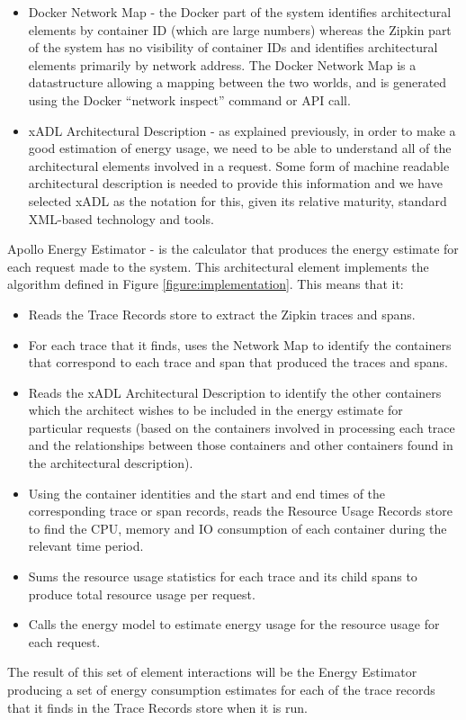 \begin{itemize}
\item Docker Network Map - the Docker part of the system identifies architectural elements by container ID (which are large numbers) whereas the Zipkin part of the system has no visibility of container IDs and identifies architectural elements primarily by network address.  The Docker Network Map is a datastructure allowing a mapping between the two worlds, and is generated using the Docker “network inspect” command or API call.
\item xADL Architectural Description - as explained previously, in order to make a good estimation of energy usage, we need to be able to understand all of the architectural elements involved in a request.  Some form of machine readable architectural description is needed to provide this information and we have selected xADL as the notation for this, given its relative maturity, standard XML-based technology and tools.
\end{itemize}

Apollo Energy Estimator - is the calculator that produces the energy estimate for each request made to the system.  This architectural element implements the algorithm defined in Figure \ref{figure:implementation}. This means that it:

\begin{itemize}
\item Reads the Trace Records store to extract the Zipkin traces and spans.
\item For each trace that it finds, uses the Network Map to identify the containers that correspond to each trace and span that produced the traces and spans.
\item Reads the xADL Architectural Description to identify the other containers which the architect wishes to be included in the energy estimate for particular requests (based on the containers involved in processing each trace and the relationships between those containers and other containers found in the architectural description).
\item Using the container identities and the start and end times of the corresponding trace or span records, reads the Resource Usage Records store to find the CPU, memory and IO consumption of each container during the relevant time period. 
\item Sums the resource usage statistics for each trace and its child spans to produce total resource usage per request.
\item Calls the energy model to estimate energy usage for the resource usage for each request.
\end{itemize}

The result of this set of element interactions will be the Energy Estimator producing a set of energy consumption estimates for each of the trace records that it finds in the Trace Records store when it is run.

